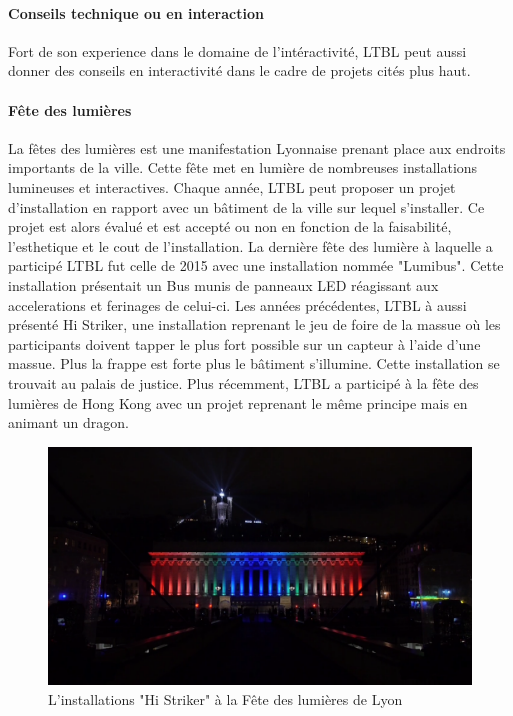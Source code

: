 \documentclass{article}
\begin{document}
\paragraph{Conseils technique ou en interaction} Fort de son experience dans le domaine de l'intéractivité, LTBL peut aussi donner des conseils en interactivité dans le cadre de projets cités plus haut.

\paragraph{Fête des lumières} La fêtes des lumières est une manifestation Lyonnaise prenant place aux endroits importants de la ville.
Cette fête met en lumière de nombreuses installations lumineuses et interactives.
Chaque année, LTBL peut proposer un projet d'installation en rapport avec un bâtiment de la ville sur lequel s'installer.
Ce projet est alors évalué et est accepté ou non en fonction de la faisabilité, l'esthetique et le cout de l'installation.
La dernière fête des lumière à laquelle a participé LTBL fut celle de 2015 avec une installation nommée "Lumibus".
Cette installation présentait un Bus munis de panneaux LED réagissant aux accelerations et ferinages de celui-ci.
Les années précédentes, LTBL à aussi présenté Hi Striker, une installation reprenant le jeu de foire de la massue où les participants doivent tapper le plus fort possible sur un capteur à l'aide d'une massue.
Plus la frappe est forte plus le bâtiment s'illumine.
Cette installation se trouvait au palais de justice.
Plus récemment, LTBL a participé à la fête des lumières de Hong Kong avec un projet reprenant le même principe mais en animant un dragon.

\begin{figure}[h]
    \centering
    \includegraphics[scale=0.2]{hi-striker.png}
    \caption{L'installations "Hi Striker" à la Fête des lumières de Lyon}
\end{figure}
\end{document}
